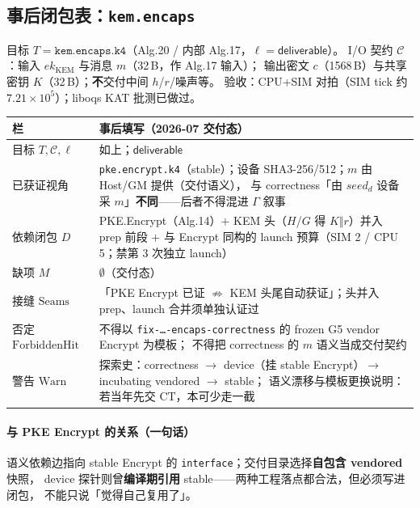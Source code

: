 \documentclass[UTF8,a4paper,11pt]{ctexart}
\theoremstyle{definition}
\theoremstyle{plain}
\theoremstyle{remark}
\numberwithin{figure}{section}
\numberwithin{table}{section}
\begin{document}
\subsection{事后闭包表：\texttt{kem.encaps}}
\label{sec:replay-ct-encaps}

目标 $T=\texttt{kem.encaps.k4}$（Alg.20 / 内部 Alg.17，$\ell=\mathsf{deliverable}$）。
I/O 契约 $\mathcal{C}$：输入 $\mathit{ek}_{\mathrm{KEM}}$ 与消息 $m$（32\,B，作 Alg.17 输入）；
输出密文 $c$（1568\,B）与共享密钥 $K$（32\,B）；\textbf{不}交付中间 $h$/$r$/噪声等。
验收：CPU+SIM 对拍（SIM tick 约 $7.21\times 10^{5}$）；liboqs KAT 批测已做过。

\begin{center}
\small
\begin{tabular}{@{}L{2.8cm}L{11.0cm}@{}}
  \toprule
  栏 & 事后填写（2026-07 交付态） \\
  \midrule
  目标 $T,\mathcal{C},\ell$ &
  如上；$\mathsf{deliverable}$ \\
  已获证视角 &
  \texttt{pke.encrypt.k4}（stable）；设备 SHA3-256/512；$m$ 由 Host/GM 提供（交付语义），
  与 correctness「由 $\mathit{seed}_d$ 设备采 $m$」\textbf{不同}——后者不得混进 $\Gamma$ 叙事 \\
  依赖闭包 $D$ &
  PKE.Encrypt（Alg.14）$+$ KEM 头（$H$/$G$ 得 $K\Vert r$）并入 prep 前段 $+$
  与 Encrypt 同构的 launch 预算（SIM 2 / CPU 5；禁第 3 次独立 launch） \\
  缺项 $M$ &
  $\emptyset$（交付态） \\
  接缝 $\mathrm{Seams}$ &
  「PKE Encrypt 已证 $\not\Rightarrow$ KEM 头尾自动获证」；头并入 prep、launch 合并须单独认证过 \\
  否定 $\mathrm{ForbiddenHit}$ &
  不得以 \texttt{fix-…-encaps-correctness} 的 frozen G5 vendor Encrypt 为模板；
  不得把 correctness 的 $m$ 语义当成交付契约 \\
  警告 $\mathrm{Warn}$ &
  探索史：correctness $\to$ device（挂 stable Encrypt）$\to$ incubating vendored $\to$ stable；
  语义漂移与模板更换说明：若当年先交 $\mathrm{CT}$，本可少走一截 \\
  \bottomrule
\end{tabular}
\end{center}

\paragraph{与 PKE Encrypt 的关系（一句话）}
语义依赖边指向 stable Encrypt 的 \texttt{interface}；交付目录选择\textbf{自包含 vendored} 快照，
device 探针则曾\textbf{编译期引用} stable——两种工程落点都合法，但必须写进闭包，
不能只说「觉得自己复用了」。
\end{document}
